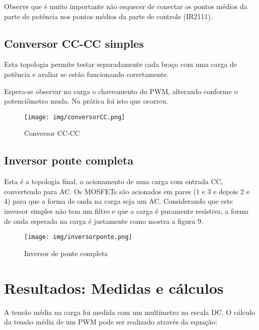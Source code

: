 \documentclass[journal, a4paper]{IEEEtran}
\begin{document}
Observe que é muito importante não esquecer de conectar os pontos médios da parte de potência nos pontos médios da parte de controle (IR2111).

\subsection{Conversor CC-CC simples}

Esta topologia permite testar separadamente cada braço com uma carga de potência e avaliar se estão funcionando corretamente.

Espera-se observar na carga o chaveamento do PWM, alterando conforme o potenciômetro muda. Na prática foi isto que ocorreu.

\begin{figure}[H]\begin{center}
	\texttt{[image: img/conversorCC.png]} 
	\caption{Conversor CC-CC}   
	\label{fig:tf_p}
\end{center}\end{figure}

\subsection{Inversor ponte completa}

Esta é a topologia final, o acionamento de uma carga com entrada CC, convertendo para AC. Os MOSFETs são acionados em pares (1 e 3 e depois 2 e 4) para que a forma de onda na carga seja um AC. Considerando que este inversor simples não tem um filtro e que a carga é puramente resistiva, a forma de onda esperada na carga é justamente como mostra a figura 9.

\begin{figure}[H]\begin{center}
	\texttt{[image: img/inversorponte.png]} 
	\caption{Inversor de ponte completa}   
	\label{fig:tf_p}
\end{center}\end{figure}

\section{Resultados: Medidas e cálculos}

A tensão média na carga foi medida com um multímetro na escala DC. O cálculo da tensão média de um PWM pode ser realizado através da equação:
\end{document}
